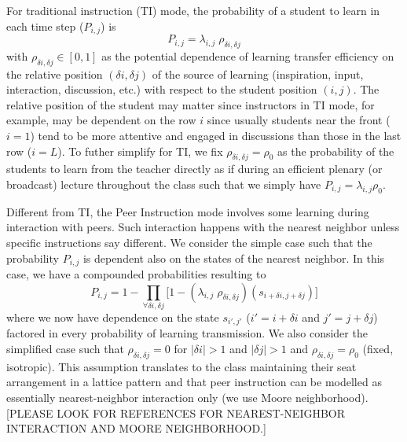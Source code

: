 \documentclass[twocolumn,secnumarabic,amssymb, nobibnotes, aps, prd]{revtex4-2}
\begin{document}

    For traditional instruction (TI) mode, the probability of a student to learn in each time step ($P_{i,j}$) is
    \begin{equation}
        P_{i,j} = \lambda_{i,j}\;\rho_{\delta i,\delta j}
    \end{equation}
    with $\rho_{\delta i,\delta j}\in[0,1]$ as the potential dependence of learning transfer efficiency on the relative position $(\delta i, \delta j)$ of the source of learning (inspiration, input, interaction, discussion, etc.) with respect to the student position $(i,j)$.
    The relative position of the student may matter since instructors in TI mode, for example, may be dependent on the row $i$ since usually students near the front ($i=1$) tend to be more attentive and engaged in discussions than those in the last row ($i=L$).
    To futher simplify for TI, we fix $\rho_{\delta i,\delta j}=\rho_{0}$ as the probability of the students to learn from the teacher directly as if during an efficient plenary (or broadcast) lecture throughout the class such that we simply have $P_{i,j} = \lambda_{i,j}\rho_0$.


    Different from TI, the Peer Instruction mode involves some learning during interaction with peers.
    Such interaction happens with the nearest neighbor unless specific instructions say different.
    We consider the simple case such that the probability $P_{i,j}$ is dependent also on the states of the nearest neighbor.
    In this case, we have a compounded probabilities resulting to
    \begin{equation} 
        \label{eq:BPCA PI learning probability}
            P_{i,j} = 1 - \prod_{\forall \delta i, \delta j}{\lbrack
                1-(\lambda_{i,j}\;\rho_{\delta i, \delta j})(s_{i+\delta i, j+\delta j})}
            \rbrack
    \end{equation}
    where we now have dependence on the state
    $s_{i',j'}$ ($i'=i+\delta i$ and $j'=j+\delta j$) factored in every probability of learning transmission.
    We also consider the simplified case such that $\rho_{\delta i, \delta j} = 0$ 
    for $|\delta i| > 1$ and $|\delta j| > 1$ and $\rho_{\delta i,\delta j}=\rho_0$ (fixed, isotropic).
    This assumption translates to the class maintaining their seat arrangement in a lattice pattern and that peer instruction can be modelled as essentially nearest-neighbor interaction only (we use Moore neighborhood).
    {\color{red}
    [PLEASE LOOK FOR REFERENCES FOR NEAREST-NEIGHBOR INTERACTION AND MOORE NEIGHBORHOOD.]
    }
\end{document}
